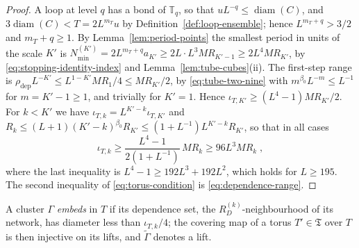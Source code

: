 \documentclass[11pt]{preprint}
\newcommand{\diam}{\operatorname{diam}}
\numberwithin{equation}{section}
\theoremstyle{definition}
\theoremstyle{remark}
\theoremstyle{plain}
\begin{document}
\begin{proof}
A loop at level $q$ has a bond of $\mathbb T_q$, so that $uL^{-q} \leq \diam(C)$, and $3\diam(C) < T = 2L^{m_T}u$ by Definition~\ref{def:loop-ensemble}; hence $L^{m_T+q} > 3/2$ and $m_T + q \geq 1$. By Lemma~\ref{lem:period-points} the smallest period in units of the scale $K'$ is $N^{(K')}_{\min} = 2L^{m_T+q}a_{K'} \geq 2L\cdot L^3MR_{K'-1} \geq 2L^4MR_{K'}$, by \eqref{eq:stopping-identity-index} and Lemma~\ref{lem:tube-cubes}(ii). The first-step range is $\rho_{\mathrm{dep}}L^{-K'} \leq L^{1-K'}MR_1/4 \leq MR_{K'}/2$, by \eqref{eq:tube-two-nine} with $m^{\beta_0}L^{-m} \leq L^{-1}$ for $m = K' - 1 \geq 1$, and trivially for $K' = 1$. Hence $\iota_{T,K'} \geq (L^4 - 1)MR_{K'}/2$. For $k < K'$ we have $\iota_{T,k} = L^{K'-k}\iota_{T,K'}$ and $R_k \leq (L + 1)(K' - k)^{\beta_0}R_{K'} \leq (1 + L^{-1})L^{K'-k}R_{K'}$, so that in all cases
\begin{equation}\label{eq:torus-margin-bound}
    \iota_{T,k} \geq \frac{L^4 - 1}{2(1 + L^{-1})}\,MR_k \geq 96L^3MR_k\;,
\end{equation}
where the last inequality is $L^4 - 1 \geq 192L^3 + 192L^2$, which holds for $L \geq 195$. The second inequality of \eqref{eq:torus-condition} is \eqref{eq:dependence-range}.
\end{proof}

A cluster $\Gamma$ \emph{embeds} in $T$ if its dependence set, the $R^{(k)}_D$-neighbourhood of its network, has diameter less than $\iota_{T,k}/4$; the covering map of a torus $T' \in \mathfrak T$ over $T$ is then injective on its lifts, and $\tilde\Gamma$ denotes a lift.
\end{document}
